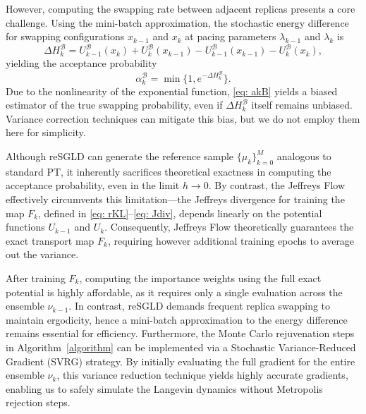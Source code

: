 \documentclass[%
 reprint,
 amsmath,amssymb,
 aps,
 pre,
]{revtex4-2}
\begin{document}
However, computing the swapping rate between adjacent replicas presents a core challenge. Using the mini-batch approximation, the stochastic energy difference for swapping configurations $x_{k-1}$ and $x_k$ at pacing parameters $\lambda_{k-1}$ and $\lambda_k$ is
\begin{equation*}
	\Delta H_k^{\mathcal B} = U_{k-1}^{\mathcal B}(x_k) + U_k^{\mathcal B}(x_{k-1}) - U_{k-1}^{\mathcal B}(x_{k-1}) - U_k^{\mathcal B}(x_k),
\end{equation*}
yielding the acceptance probability
\begin{equation}
\alpha_k^{\mathcal B} = \min\big\{1, e^{-\Delta H_k^{\mathcal B}}\big\}.
\label{eq: akB}
\end{equation}
Due to the nonlinearity of the exponential function, \eqref{eq: akB} yields a biased estimator of the true swapping probability, even if $\Delta H_k^{\mathcal B}$ itself remains unbiased. Variance correction techniques \cite{deng2020accelerating} can mitigate this bias, but we do not employ them here for simplicity.

Although reSGLD can generate the reference sample $\{\mu_k\}_{k=0}^M$ analogous to standard PT, it inherently sacrifices theoretical exactness in computing the acceptance probability, even in the limit $h \to 0$. By contrast, the Jeffreys Flow effectively circumvents this limitation---the Jeffreys divergence for training the map $F_k$, defined in \eqref{eq: rKL}--\eqref{eq: Jdiv}, depends linearly on the potential functions $U_{k-1}$ and $U_k$. Consequently, Jeffreys Flow theoretically guarantees the exact transport map $F_k$, requiring however additional training epochs to average out the variance.

After training $F_k$, computing the importance weights using the full exact potential is highly affordable, as it requires only a single evaluation across the ensemble $\nu_{k-1}$. In contrast, reSGLD demands frequent replica swapping to maintain ergodicity, hence a mini-batch approximation to the energy difference remains essential for efficiency. Furthermore, the Monte Carlo rejuvenation steps in Algorithm~\ref{algorithm} can be implemented via a Stochastic Variance-Reduced Gradient (SVRG) \cite{johnson2013accelerating,reddi2016stochastic} strategy. By initially evaluating the full gradient for the entire ensemble $\nu_k$, this variance reduction technique yields highly accurate gradients, enabling us to safely simulate the Langevin dynamics without Metropolis rejection steps.
\end{document}
